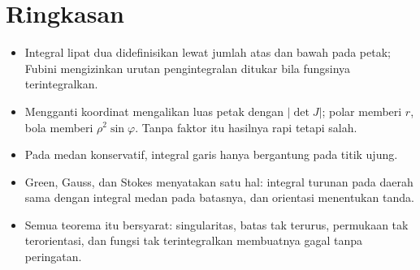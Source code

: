 \section{Ringkasan}
\begin{ringkasan}
\begin{itemize}
\item Integral lipat dua didefinisikan lewat jumlah atas dan bawah pada petak;
Fubini mengizinkan urutan pengintegralan ditukar bila fungsinya terintegralkan.
\item Mengganti koordinat mengalikan luas petak dengan $|\det J|$; polar memberi
$r$, bola memberi $\rho^{2}\sin\varphi$. Tanpa faktor itu hasilnya rapi tetapi
salah.
\item Pada medan konservatif, integral garis hanya bergantung pada titik ujung.
\item Green, Gauss, dan Stokes menyatakan satu hal: integral turunan pada daerah
sama dengan integral medan pada batasnya, dan orientasi menentukan tanda.
\item Semua teorema itu bersyarat: singularitas, batas tak terurus, permukaan tak
terorientasi, dan fungsi tak terintegralkan membuatnya gagal tanpa peringatan.
\end{itemize}
\end{ringkasan}

